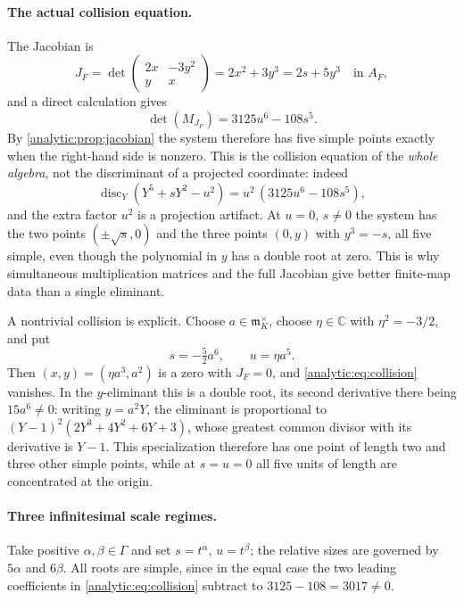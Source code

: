 \documentclass[11pt,letterpaper]{article}
\theoremstyle{definition}
\theoremstyle{remark}
\newcommand{\C}{\mathbb C}
\newcommand{\m}{\mathfrak m}
\newcommand{\disc}{\operatorname{disc}}
\numberwithin{equation}{section}
\begin{document}
\paragraph{The actual collision equation.}
The Jacobian is
\begin{equation}\label{analytic:eq:exampleJ}
 J_F=\det\begin{pmatrix}2x&-3y^2\\ y&x\end{pmatrix}
 =2x^2+3y^3=2s+5y^3\quad\text{in }A_F ,
\end{equation}
and a direct calculation gives
\begin{equation}\label{analytic:eq:collision}
 \det(M_{J_F})=3125u^6-108s^5 .
\end{equation}
By \cref{analytic:prop:jacobian} the system therefore has five simple
points exactly when the right-hand side is nonzero. This is the collision
equation of the \emph{whole algebra}, not the discriminant of a projected
coordinate: indeed
\begin{equation}\label{analytic:eq:projecteddiscriminant}
 \disc_Y(Y^5+sY^2-u^2)=u^2\,(3125u^6-108s^5),
\end{equation}
and the extra factor $u^2$ is a projection artifact. At $u=0$, $s\ne0$ the
system has the two points $(\pm\sqrt s,0)$ and the three points $(0,y)$ with
$y^3=-s$, all five simple, even though the polynomial in $y$ has a double
root at zero. This is why simultaneous multiplication matrices and the full
Jacobian give better finite-map data than a single eliminant.

A nontrivial collision is explicit. Choose $a\in\m_K^\times$, choose
$\eta\in\C$ with $\eta^2=-3/2$, and put
\[
 s=-\tfrac52a^6,\qquad u=\eta a^5 .
\]
Then $(x,y)=(\eta a^3,a^2)$ is a zero with $J_F=0$, and
\eqref{analytic:eq:collision} vanishes. In the $y$-eliminant this is a
double root, its second derivative there being $15a^6\ne0$: writing
$y=a^2Y$, the eliminant is proportional to $(Y-1)^2(2Y^3+4Y^2+6Y+3)$, whose
greatest common divisor with its derivative is $Y-1$. This specialization
therefore has one point of length two and three other simple points, while
at $s=u=0$ all five units of length are concentrated at the origin.

\paragraph{Three infinitesimal scale regimes.}
Take positive $\alpha,\beta\in\Gamma$ and set $s=t^\alpha$, $u=t^\beta$;
the relative sizes are governed by $5\alpha$ and $6\beta$. All roots are
simple, since in the equal case the two leading coefficients in
\eqref{analytic:eq:collision} subtract to $3125-108=3017\ne0$.
\end{document}
